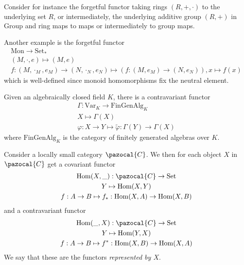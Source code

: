 \begin{example}
    Consider for instance the forgetful functor taking rings $(R,+,\cdot)$ to the underlying set $R$, or intermediately, the underlying additive group $(R,+)$ in $\mathrm{Group}$ and ring maps to maps or intermediately to group maps.  
\end{example}
\begin{example}
    Another example is the forgetful functor 
    \begin{gather*}
        \mathrm{Mon} \rightarrow \mathrm{Set}_\ast\\
        (M,\cdot,e)\mapsto (M,e)\\
        f : (M,\cdot_M,e_M)\rightarrow (N,\cdot_N,e_N) \mapsto (f: (M,e_M)\rightarrow (N,e_N)), x\mapsto f(x)
    \end{gather*}
    which is well-defined since monoid homomorphisms fix the neutral element.
\end{example}
\begin{example}
    Given an algebraically closed field $K$, there is a contravariant functor
    \begin{gather*}
        \Gamma : \mathrm{Var}_K\rightarrow \mathrm{FinGenAlg}_K\\
        X \mapsto \Gamma(X)\\
        \varphi : X\rightarrow Y \mapsto \widetilde{\varphi} : \Gamma(Y)\rightarrow \Gamma(X)
    \end{gather*}
    where $\mathrm{FinGenAlg}_K$ is the category of finitely generated algebras over $K$.
\end{example}
\begin{definition}
    Consider a locally small category $\pazocal{C}$. We then for each object $X$ in $\pazocal{C}$ get a covariant functor 
    \begin{gather*}
        \Hom(X,\_) : \pazocal{C}\rightarrow \mathrm{Set}\\
        Y\mapsto \Hom(X,Y)\\
        f : A\rightarrow B \mapsto f_\ast: \Hom(X,A)\rightarrow \Hom(X,B) 
    \end{gather*}
    and a contravariant functor
    \begin{gather*}
        \Hom(\_,X) : \pazocal{C} \rightarrow \mathrm{Set}\\
        Y \mapsto \Hom(Y,X)\\
        f : A\rightarrow B \mapsto f^\ast: \Hom(X,B)\rightarrow \Hom(X,A) 
    \end{gather*}
    We say that these are the functors \emph{represented by $X$}.
\end{definition}
